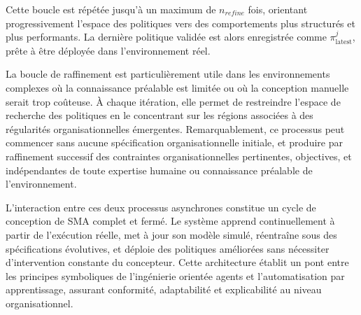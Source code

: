 Cette boucle est répétée jusqu'à un maximum de $n_{refine}$ fois, orientant progressivement l'espace des politiques vers des comportements plus structurés et plus performants. La dernière politique validée est alors enregistrée comme $\pi^j_{\text{latest}}$, prête à être déployée dans l'environnement réel.

La boucle de raffinement est particulièrement utile dans les environnements complexes où la connaissance préalable est limitée ou où la conception manuelle serait trop coûteuse. À chaque itération, elle permet de restreindre l'espace de recherche des politiques en le concentrant sur les régions associées à des régularités organisationnelles émergentes. Remarquablement, ce processus peut commencer sans aucune spécification organisationnelle initiale, et produire par raffinement successif des contraintes organisationnelles pertinentes, objectives, et indépendantes de toute expertise humaine ou connaissance préalable de l'environnement.

\noindent L'interaction entre ces deux processus asynchrones constitue un cycle de conception de \ac{SMA} complet et fermé. Le système apprend continuellement à partir de l'exécution réelle, met à jour son modèle simulé, réentraîne sous des spécifications évolutives, et déploie des politiques améliorées sans nécessiter d'intervention constante du concepteur. Cette architecture établit un pont entre les principes symboliques de l'ingénierie orientée agents et l'automatisation par apprentissage, assurant conformité, adaptabilité et explicabilité au niveau organisationnel.

